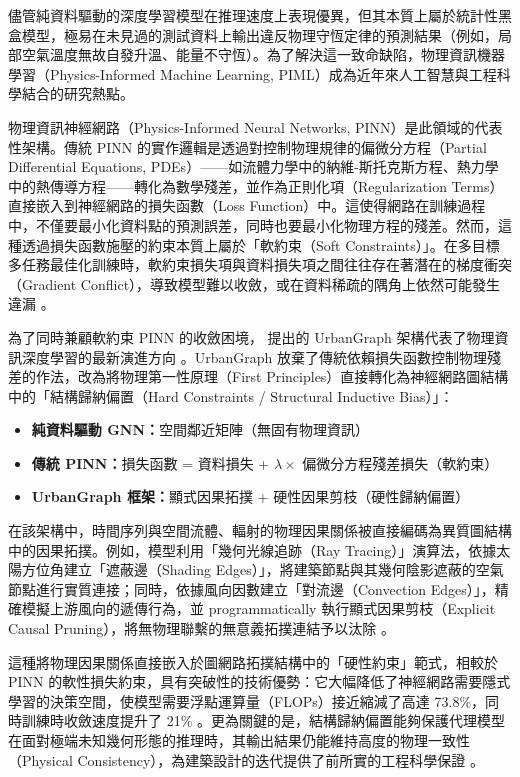 儘管純資料驅動的深度學習模型在推理速度上表現優異，但其本質上屬於統計性黑盒模型，極易在未見過的測試資料上輸出違反物理守恆定律的預測結果（例如，局部空氣溫度無故自發升溫、能量不守恆）。為了解決這一致命缺陷，物理資訊機器學習（Physics-Informed Machine Learning, PIML）成為近年來人工智慧與工程科學結合的研究熱點。

物理資訊神經網路（Physics-Informed Neural Networks, PINN）是此領域的代表性架構。傳統 PINN 的實作邏輯是透過對控制物理規律的偏微分方程（Partial Differential Equations, PDEs）——如流體力學中的納維-斯托克斯方程、熱力學中的熱傳導方程——轉化為數學殘差，並作為正則化項（Regularization Terms）直接嵌入到神經網路的損失函數（Loss Function）中。這使得網路在訓練過程中，不僅要最小化資料點的預測誤差，同時也要最小化物理方程的殘差。然而，這種透過損失函數施壓的約束本質上屬於「軟約束（Soft Constraints）」。在多目標多任務最佳化訓練時，軟約束損失項與資料損失項之間往往存在著潛在的梯度衝突（Gradient Conflict），導致模型難以收斂，或在資料稀疏的隅角上依然可能發生違漏 \citep{xin2025urbangraph}。

為了同時兼顧軟約束 PINN 的收斂困境，\cite{xin2025urbangraph} 提出的 UrbanGraph 架構代表了物理資訊深度學習的最新演進方向 \citep{xin2025urbangraph}。UrbanGraph 放棄了傳統依賴損失函數控制物理殘差的作法，改為將物理第一性原理（First Principles）直接轉化為神經網路圖結構中的「結構歸納偏置（Hard Constraints / Structural Inductive Bias）」：

\begin{itemize}
    \item \textbf{純資料驅動 GNN：}空間鄰近矩陣（無固有物理資訊）
    \item \textbf{傳統 PINN：}損失函數 = 資料損失 + $\lambda \times$ 偏微分方程殘差損失（軟約束）
    \item \textbf{UrbanGraph 框架：}顯式因果拓撲 + 硬性因果剪枝（硬性歸納偏置）
\end{itemize}

在該架構中，時間序列與空間流體、輻射的物理因果關係被直接編碼為異質圖結構中的因果拓撲。例如，模型利用「幾何光線追跡（Ray Tracing）」演算法，依據太陽方位角建立「遮蔽邊（Shading Edges）」，將建築節點與其幾何陰影遮蔽的空氣節點進行實質連接；同時，依據風向因數建立「對流邊（Convection Edges）」，精確模擬上游風向的遞傳行為，並 programmatically 執行顯式因果剪枝（Explicit Causal Pruning），將無物理聯繫的無意義拓撲連結予以汰除 \citep{xin2025urbangraph}。

這種將物理因果關係直接嵌入於圖網路拓撲結構中的「硬性約束」範式，相較於 PINN 的軟性損失約束，具有突破性的技術優勢：它大幅降低了神經網路需要隱式學習的決策空間，使模型需要浮點運算量（FLOPs）接近縮減了高達 73.8\%，同時訓練時收斂速度提升了 21\% \citep{xin2025urbangraph}。更為關鍵的是，結構歸納偏置能夠保護代理模型在面對極端未知幾何形態的推理時，其輸出結果仍能維持高度的物理一致性（Physical Consistency），為建築設計的迭代提供了前所實的工程科學保證 \citep{oskarsson2023modeling,xin2025urbangraph}。


